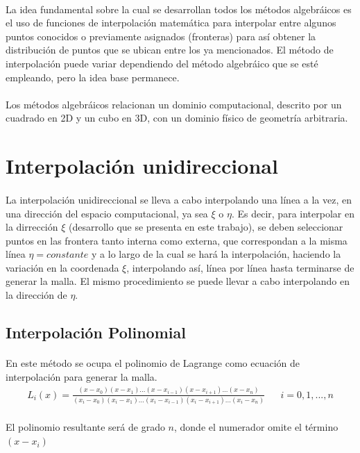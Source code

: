 \documentclass[letterpaper, openright, 12pt]{book}
\begin{document}
	\paragraph*{}
		La idea fundamental sobre la cual se desarrollan todos los métodos algebráicos es el uso de funciones de interpolación matemática para interpolar entre algunos puntos conocidos o previamente asignados (fronteras) para así obtener la distribución de puntos que se ubican entre los ya mencionados. El método de interpolación puede variar dependiendo del método algebráico que se esté empleando, pero la idea base permanece. \cite{siladic-grid-generation}
	\paragraph*{}
		Los métodos algebráicos relacionan un dominio computacional, descrito por un cuadrado en 2D y un cubo en 3D, con un dominio físico de geometría arbitraria.
		
		
	\section{Interpolación unidireccional}
		\paragraph*{}
			La interpolación unidireccional se lleva a cabo interpolando una línea a la vez, en una dirección del espacio computacional, ya sea $\xi$ o $\eta$. Es decir, para interpolar en la dirrección $\xi$ (desarrollo que se presenta en este trabajo), se deben seleccionar puntos en las frontera tanto interna como externa, que correspondan a la misma línea $\eta = constante$ y a lo largo de la cual se hará la interpolación, haciendo la variación en la coordenada $\xi$, interpolando así, línea por línea hasta terminarse de generar la malla. El mismo procedimiento se puede llevar a cabo interpolando en la dirección de $\eta$.
		\subsection{Interpolación Polinomial}
			\paragraph*{}
				En este método se ocupa el polinomio de Lagrange como ecuación de interpolación para generar la malla.
				\begin{align}
					L_{i}(x) = \frac{ (x - x_{0} )(x - x_{1}) . . . (x - x_{i-1}) (x - x_{i+1}) . . . (x - x_{n}) }{(x_{i} - x_{0} )(x_{i} - x_{1}) . . . (x_{i} - x_{i-1}) (x_{i} - x_{i+1}) . . . (x_{i} - x_{n}) } && i = 0, 1, ... , n
				\end{align}
				\\El polinomio resultante será de grado $n$, donde el numerador omite el término $(x - x_{i})$
			
\end{document}
